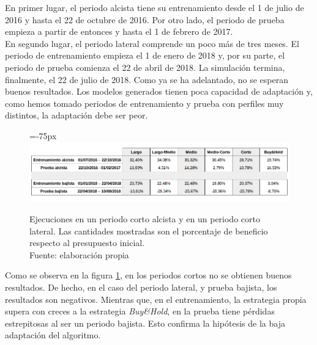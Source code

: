 En primer lugar, el periodo alcista tiene su entrenamiento desde el 1 de julio de 2016 y hasta el 22 de octubre de 2016. Por otro lado, el periodo de prueba empieza a partir de entonces y hasta el 1 de febrero de 2017.\\

En segundo lugar, el periodo lateral comprende un poco m\'as de tres meses. El periodo de entrenamiento empieza el 1 de enero de 2018 y, por su parte, el periodo de prueba comienza el 22 de abril de 2018. La simulaci\'on termina, finalmente, el 22 de julio de 2018. Como ya se ha adelantado, no se esperan buenos resultados. Los modelos generados tienen poca capacidad de adaptaci\'on y, como hemos tomado periodos de entrenamiento y prueba con perfiles muy distintos, la adaptaci\'on debe ser peor.\\

     	\begin{figure}[H]
     		\centering\leftskip=-75px
     		\includegraphics[scale=0.60]{imagenes/Short_period.png}
     		\caption[Ejecuciones en un periodo corto alcista y en un periodo corto lateral]{Ejecuciones en un periodo corto alcista y en un periodo corto lateral. Las cantidades mostradas son el porcentaje de beneficio respecto al presupuesto inicial.\\ Fuente: elaboraci\'on propia}
     		\label{fig:short_period}
     	\end{figure}

Como se observa en la figura \ref{fig:short_period}, en los periodos cortos no se obtienen buenos resultados. De hecho, en el caso del periodo lateral, y prueba bajista, los resultados son negativos. Mientras que, en el entrenamiento, la estrategia propia supera con creces a la estrategia \textit{Buy\&Hold}, en la prueba tiene p\'erdidas estrepitosas al ser un periodo bajista. Esto confirma la hip\'otesis de la baja adaptaci\'on del algoritmo.\\

